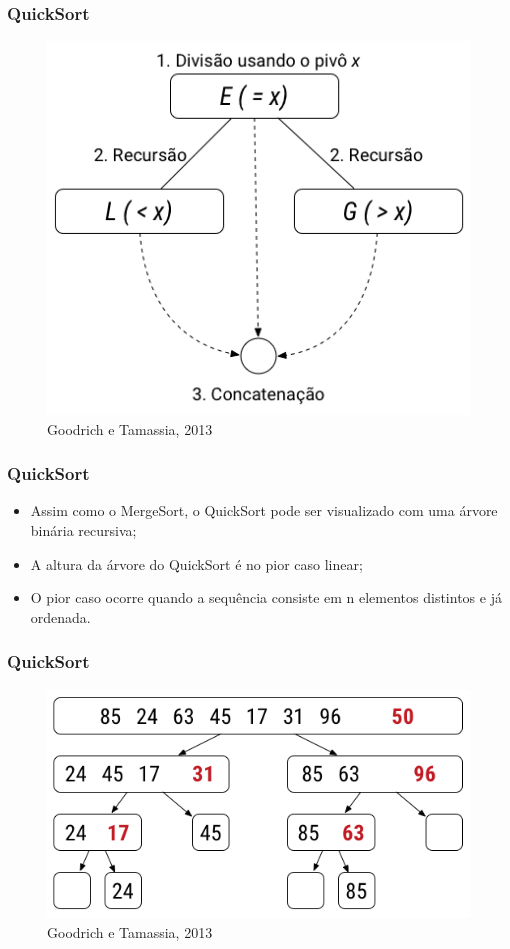 \documentclass{beamer}
\begin{document}
\begin{frame}
    \frametitle{QuickSort}
    \begin{figure}
        \centering
        \includegraphics[scale=0.5]{images/esquema-visual.png}
        \caption{Goodrich e Tamassia, 2013}
    \end{figure}
\end{frame}

\begin{frame}
    \frametitle{QuickSort}
    \begin{itemize}[<+->]
        \item Assim como o MergeSort, o QuickSort pode ser visualizado com uma árvore binária recursiva;
        \item A altura da árvore do QuickSort é no pior caso linear;
        \item O pior caso ocorre quando a sequência consiste em n elementos distintos e já ordenada.
    \end{itemize}
\end{frame}

\begin{frame}
    \frametitle{QuickSort}
    \begin{figure}
        \centering
        \includegraphics[scale=0.5]{images/ida.png}
        \caption{Goodrich e Tamassia, 2013}
    \end{figure}
\end{frame}
\end{document}
